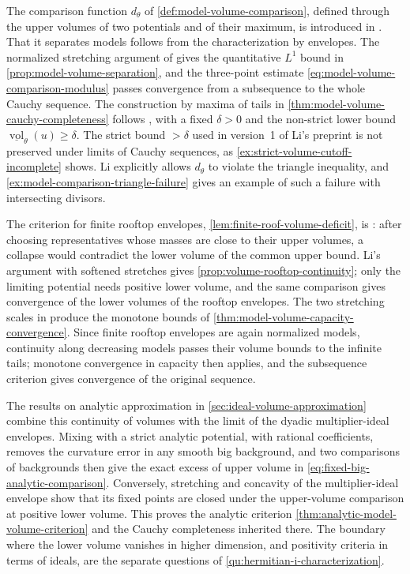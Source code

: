 The comparison function $d_\theta$ of \cref{def:model-volume-comparison}, defined through the upper volumes of two potentials and of their maximum, is introduced in \cite[v1, Section 4.2]{XL26}. That it separates models follows from the characterization by envelopes. The normalized stretching argument of \cite[v1, Lemma 4.2]{XL26} gives the quantitative $L^1$ bound in \cref{prop:model-volume-separation}, and the three-point estimate \eqref{eq:model-volume-comparison-modulus} passes convergence from a subsequence to the whole Cauchy sequence. The construction by maxima of tails in \cref{thm:model-volume-cauchy-completeness} follows \cite[v1, Theorem 4.3]{XL26}, with a fixed $\delta>0$ and the non-strict lower bound $\underline{\operatorname{vol}}_\theta(u)\geq\delta$. The strict bound $>\delta$ used in version~1 of Li's preprint is not preserved under limits of Cauchy sequences, as \cref{ex:strict-volume-cutoff-incomplete} shows. Li explicitly allows $d_\theta$ to violate the triangle inequality, and \cref{ex:model-comparison-triangle-failure} gives an example of such a failure with intersecting divisors.

The criterion for finite rooftop envelopes, \cref{lem:finite-roof-volume-deficit}, is \cite[v1, Lemma 4.1]{XL26}: after choosing representatives whose masses are close to their upper volumes, a collapse would contradict the lower volume of the common upper bound. Li's argument with softened stretches \cite[v1, Proposition 4.4]{XL26} gives \cref{prop:volume-rooftop-continuity}; only the limiting potential needs positive lower volume, and the same comparison gives convergence of the lower volumes of the rooftop envelopes. The two stretching scales in \cite[v1, Theorem 4.4]{XL26} produce the monotone bounds of \cref{thm:model-volume-capacity-convergence}. Since finite rooftop envelopes are again normalized models, continuity along decreasing models passes their volume bounds to the infinite tails; monotone convergence in capacity then applies, and the subsequence criterion gives convergence of the original sequence.

The results on analytic approximation in \cref{sec:ideal-volume-approximation} combine this continuity of volumes with the limit of the dyadic multiplier-ideal envelopes. Mixing with a strict analytic potential, with rational coefficients, removes the curvature error in any smooth big background, and two comparisons of backgrounds then give the exact excess of upper volume in \eqref{eq:fixed-big-analytic-comparison}. Conversely, stretching and concavity of the multiplier-ideal envelope show that its fixed points are closed under the upper-volume comparison at positive lower volume. This proves the analytic criterion \cref{thm:analytic-model-volume-criterion} and the Cauchy completeness inherited there. The boundary where the lower volume vanishes in higher dimension, and positivity criteria in terms of ideals, are the separate questions of \cref{qu:hermitian-i-characterization}.

